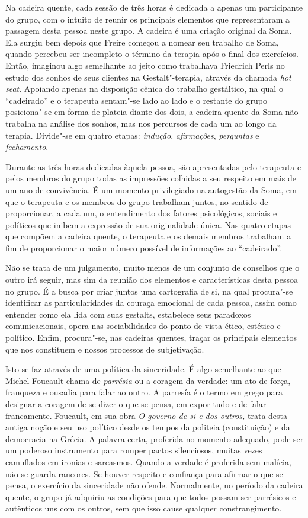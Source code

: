 Na cadeira quente, cada sessão de três horas é dedicada a apenas um
participante do grupo, com o intuito de reunir os principais elementos
que representaram a passagem desta pessoa neste grupo. A cadeira é uma
criação original da Soma. Ela surgiu bem depois que Freire começou a
nomear seu trabalho de Soma, quando percebeu ser incompleto o término da
terapia após o final dos exercícios. Então, imaginou algo semelhante ao
jeito como trabalhava Friedrich Perls no estudo dos sonhos de seus
clientes na Gestalt"-terapia, através da chamada \emph{hot seat}. Apoiando
apenas na disposição cênica do trabalho gestáltico, na qual o
``cadeirado'' e o terapeuta sentam"-se lado ao lado e o restante do grupo
posiciona"-se em forma de plateia diante dos dois, a cadeira quente da
Soma não trabalha na análise dos sonhos, mas nos percursos de cada um ao
longo da terapia. Divide"-se em quatro etapas: \emph{indução},
\emph{afirmações}, \emph{perguntas} e \emph{fechamento}.

Durante as três horas dedicadas àquela pessoa, são apresentadas pelo
terapeuta e pelos membros do grupo todas as impressões colhidas a seu
respeito em mais de um ano de convivência. É um momento privilegiado na
autogestão da Soma, em que o terapeuta e os membros do grupo trabalham
juntos, no sentido de proporcionar, a cada um, o entendimento dos fatores
psicológicos, sociais e políticos que inibem a expressão de sua
originalidade única. Nas quatro etapas que compõem a cadeira quente, o
terapeuta e os demais membros trabalham a fim de proporcionar o maior
número possível de informações ao ``cadeirado''.

Não se trata de um julgamento, muito menos de um conjunto de conselhos
que o outro irá seguir, mas sim da reunião dos elementos e
características desta pessoa no grupo. É a busca por criar juntos uma
cartografia de si, na qual procura"-se identificar as particularidades da
couraça emocional de cada pessoa, assim como entender como ela lida com
suas gestalts, estabelece seus paradoxos comunicacionais, opera nas
sociabilidades do ponto de vista ético, estético e político. Enfim,
procura"-se, nas cadeiras quentes, traçar os principais elementos que nos
constituem e nossos processos de subjetivação.

Isto se faz através de uma política da sinceridade. É algo semelhante ao
que Michel Foucault chama de \emph{parrésia} ou a coragem da verdade: um
ato de força, franqueza e ousadia para falar ao outro. A parresía é o
termo em grego para designar a coragem de se dizer o que se pensa, em
expor tudo e de falar francamente. Foucault, em sua obra \emph{O governo
de si e dos outros,} trata desta antiga noção e seu uso político desde
os tempos da politeia (constituição) e da democracia na Grécia. A
palavra certa, proferida no momento adequado, pode ser um poderoso
instrumento para romper pactos silenciosos, muitas vezes camuflados em
ironias e sarcasmos. Quando a verdade é proferida sem malícia, não se
guarda rancores. Se houver respeito e confiança para afirmar o que se
pensa, o exercício da sinceridade não ofende. Normalmente, no período da
cadeira quente, o grupo já adquiriu as condições para que todos possam
ser parrésicos e autênticos uns com os outros, sem que isso cause
qualquer constrangimento.

